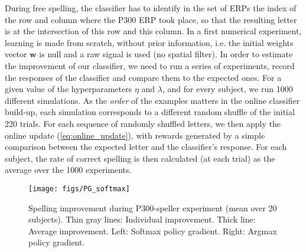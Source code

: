 \documentclass[conference]{IEEEtran}
\begin{document}
During free spelling, the classifier has to identify in the set of ERPs the index of the row and column where the P300 ERP
took place, so that the resulting letter is at the intersection of this row and this column. 
In a first numerical experiment, learning is made from scratch, without prior information,
i.e. the initial weights vector $\boldsymbol{w}$ is null
and a raw signal is used (no spatial filter).
In order to estimate the improvement of our classifier, we need to run a series of experiments,
record the responses of the classifier
and compare them to the expected ones. 
For a given value of the hyperparameters $\eta$ and $\lambda$, and for every subject, we run 1000 different simulations.
As the \emph{order} of the examples matters in the online classifier build-up,
each simulation corresponds to a different random shuffle of the initial 220 trials.
For each sequence of randomly shuffled letters, we then apply the 
online update (\ref{eq:online_update}), with rewards generated by a simple comparison between the expected
letter %
and the classifier's response.  
For each subject, the rate of correct spelling is then calculated
(at each trial) as the average over the 1000 experiments.

\begin{figure}
\centerline{
 \texttt{[image: figs/PG\_softmax]}
}
\caption{Spelling improvement during P300-speller experiment (mean over 20 subjects). 
Thin gray lines: Individual improvement. Thick line: Average improvement. 
Left: Softmax policy gradient. Right: Argmax policy gradient. 
}
\label{fig:PG_ref}
\end{figure}
\end{document}

